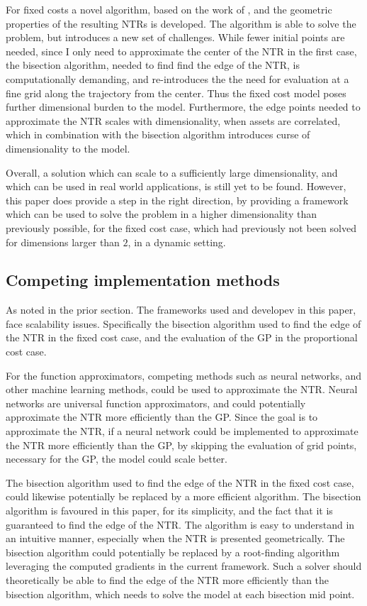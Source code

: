 \documentclass[11pt]{article}
\begin{document}
For fixed costs a novel algorithm, based on the work of \autocite{Scheidegger2023}, and the geometric properties
of the resulting \ac{NTR}s is developed. The algorithm is able to solve the problem, but introduces a new set of challenges.
While fewer initial points are needed, since I only need to approximate the center of the \ac{NTR} in the first case,
the bisection algorithm, needed to find find the edge of the \ac{NTR}, is computationally demanding, and re-introduces the the need
for evaluation at a fine grid along the trajectory from the center. Thus the fixed cost model poses further dimensional burden to the model.
Furthermore, the edge points needed to approximate the \ac{NTR} scales with dimensionality,
when assets are correlated, which in combination with the bisection algorithm introduces curse of dimensionality to the model.

Overall, a solution which can scale to a sufficiently large dimensionality, and which can be used in real world applications, is still yet to be found.
However, this paper does provide a step in the right direction, by providing a framework which can be used to solve the problem in a higher dimensionality than previously possible,
for the fixed cost case, which had previously not been solved for dimensions larger than $2$, in a dynamic setting.
\subsection{Competing implementation methods} \label{Subsection: Competing solution methods}
As noted in the prior section. The frameworks used and developev in this paper, face scalability issues.
Specifically the bisection algorithm used to find the edge of the \ac{NTR} in the fixed cost case, and the evaluation of the \ac{GP} in the proportional cost case.

For the function approximators, competing methods such as neural networks, and other machine learning methods, could be used to approximate the \ac{NTR}.
Neural networks are universal function approximators, and could potentially approximate the \ac{NTR} more efficiently than the \ac{GP}.
Since the goal is to approximate the \ac{NTR}, if a neural network could be implemented to approximate the \ac{NTR} more efficiently than the \ac{GP},
by skipping the evaluation of grid points, necessary for the \ac{GP}, the model could scale better.

The bisection algorithm used to find the edge of the \ac{NTR} in the fixed cost case, could likewise potentially be replaced by a more efficient algorithm.
The bisection algorithm is favoured in this paper, for its simplicity, and the fact that it is guaranteed to find the edge of the \ac{NTR}.
The algorithm is easy to understand in an intuitive manner, especially when the \ac{NTR} is presented geometrically.
The bisection algorithm could potentially be replaced by a root-finding algorithm leveraging the computed gradients in the current framework.
Such a solver should theoretically be able to find the edge of the \ac{NTR} more efficiently than the bisection algorithm, which needs to solve the model at each bisection mid point. 
\end{document}
